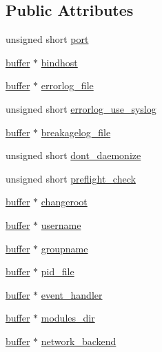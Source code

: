 \subsection*{Public Attributes}
\begin{DoxyCompactItemize}
\item 
unsigned short \hyperlink{structserver__config_ac5aeb6f87f80796f8082d21bcb8ed307}{port}
\item 
\hyperlink{structbuffer}{buffer} $\ast$ \hyperlink{structserver__config_ad0f33959056b9d6aaf99e4a5b7665f02}{bindhost}
\item 
\hyperlink{structbuffer}{buffer} $\ast$ \hyperlink{structserver__config_a82fb5aa6eae597e14012a95f1b1a6179}{errorlog\-\_\-file}
\item 
unsigned short \hyperlink{structserver__config_a56c87425f923a696ac63d382374d1c38}{errorlog\-\_\-use\-\_\-syslog}
\item 
\hyperlink{structbuffer}{buffer} $\ast$ \hyperlink{structserver__config_af7869cc9b438a05394b1338e489f3f6c}{breakagelog\-\_\-file}
\item 
unsigned short \hyperlink{structserver__config_a2a95b6b73b4f971a0cfe7cd92673f668}{dont\-\_\-daemonize}
\item 
unsigned short \hyperlink{structserver__config_a21ecff523665604359cbcd56cc12bb84}{preflight\-\_\-check}
\item 
\hyperlink{structbuffer}{buffer} $\ast$ \hyperlink{structserver__config_ae0022338b6e503d9e0530d9cb0fd9f52}{changeroot}
\item 
\hyperlink{structbuffer}{buffer} $\ast$ \hyperlink{structserver__config_ad69c102b32ff59d24d6538b7f3fb35d2}{username}
\item 
\hyperlink{structbuffer}{buffer} $\ast$ \hyperlink{structserver__config_a2d31977d5069399039cb03c46150983a}{groupname}
\item 
\hyperlink{structbuffer}{buffer} $\ast$ \hyperlink{structserver__config_ad4a5f5cea7a714d24d39808484eaff76}{pid\-\_\-file}
\item 
\hyperlink{structbuffer}{buffer} $\ast$ \hyperlink{structserver__config_a1b43ba20d0dcd69f6078661c418b4101}{event\-\_\-handler}
\item 
\hyperlink{structbuffer}{buffer} $\ast$ \hyperlink{structserver__config_a06280142a08f0801a2ee4c77f1d43072}{modules\-\_\-dir}
\item 
\hyperlink{structbuffer}{buffer} $\ast$ \hyperlink{structserver__config_a2f7bb5d246577003946252d28b70cf81}{network\-\_\-backend}
\item 

\end{DoxyCompactItemize}
